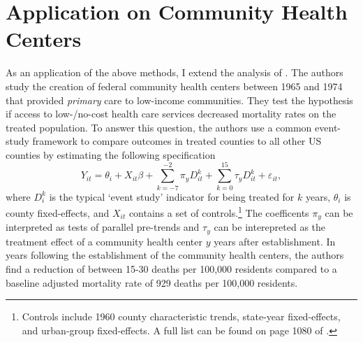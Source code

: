 \documentclass[11pt]{article}
\begin{document}
\section{Application on Community Health Centers}\label{sec:chc}

As an application of the above methods, I extend the analysis of \citet{Bailey_Goodman_Bacon_2015}. The authors study the creation of federal community health centers between 1965 and 1974 that provided \textit{primary} care to low-income communities. They test the hypothesis if access to low-/no-cost health care services decreased mortality rates on the treated population. To answer this question, the authors use a common event-study framework to compare outcomes in treated counties to all other US counties by estimating the following specification 
\begin{equation}\label{eq:chc_es}
    Y_{it} = \theta_i + X_{it} \beta + \sum_{k = -7}^{-2} \pi_y D_{it}^k + \sum_{k = 0}^{15} \tau_{y} D_{it}^k + \varepsilon_{it},
\end{equation}
where $D_i^k$ is the typical `event study' indicator for being treated for $k$ years, $\theta_i$ is county fixed-effects, and $X_{it}$ contains a set of controls.\footnote{Controls include 1960 county characteristic trends, state-year fixed-effects, and urban-group fixed-effects. A full list can be found on page 1080 of \citet{Bailey_Goodman_Bacon_2015}.} The coefficents $\pi_y$ can be interpreted as tests of parallel pre-trends and $\tau_y$ can be interepreted as the treatment effect of a community health center $y$ years after establishment. In years following the establishment of the community health centers, the authors find a reduction of between 15-30 deaths per 100,000 residents compared to a baseline adjusted mortality rate of 929 deaths per 100,000 residents. 
\end{document}
